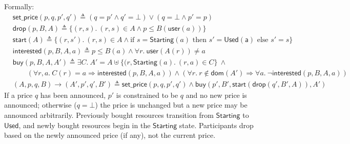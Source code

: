 \documentclass[acmsmall,review,screen]{acmart}
\begin{document}
Formally:
\begin{align*}
&\mathsf{set\_price}(p, q, p', q') \triangleq (q = p' \land q' = \bot) \lor (q = \bot \land p' = p)\\
&\mathsf{drop}(p, B, A) \triangleq \{(r, s).\ (r, s) \in A \land p \leq B(\mathsf{user}(a))\}\\
&\mathsf{start}(A) \triangleq \{(r, s').\ (r, s) \in A \land \text{if } s = \mathsf{Starting}(a) \text{ then } s' = \mathsf{Used(a)} \text{ else } s' = s\}\\
&\mathsf{interested}(p, B, A, a) \triangleq p \leq B(a) \land \forall r.\ \mathsf{user}(A(r)) \neq a\\
&\mathsf{buy}(p, B, A, A') \triangleq \exists C.\ A' = A \uplus \{(r, \mathsf{Starting}(a).\ (r, a) \in C\}\ \land \\&\qquad (\forall r, a.\ C(r) = a \Rightarrow \mathsf{interested}(p, B, A, a)) \land (\forall r.\ r \not\in \mathsf{dom}(A') \Rightarrow \forall a.\ \neg \mathsf{interested}(p, B, A, a))\\
&(A, p, q, B) \rightarrow (A', p', q', B') \triangleq \mathsf{set\_price}(p, q, p', q') \land \mathsf{buy}(p', B', \mathsf{start}(\mathsf{drop}(q', B', A)), A')
\end{align*}
If a price $q$ has been announced, $p'$ is constrained to be $q$ and no new price is announced; otherwise ($q = \bot$) the price is unchanged but a new price may be announced arbitrarily. Previously bought resources transition from $\mathsf{Starting}$ to $\mathsf{Used}$, and newly bought resources begin in the $\mathsf{Starting}$ state. Participants drop based on the newly announced price (if any), not the current price.
\end{document}
